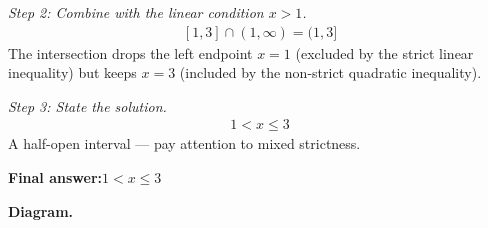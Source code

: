 \documentclass[11pt]{article}
\begin{document}
\textit{Step 2: Combine with the linear condition \( x > 1 \).}
\[\begin{gathered}
[1, 3] \cap (1, \infty) = (1, 3]
\end{gathered}\]
The intersection drops the left endpoint \( x = 1 \) (excluded by the strict linear inequality) but keeps \( x = 3 \) (included by the non-strict quadratic inequality).

\textit{Step 3: State the solution.}
\[\begin{gathered}
1 < x \leq 3
\end{gathered}\]
A half-open interval --- pay attention to mixed strictness.

\begin{answerbox}
\textbf{Final answer:}\quad \(\displaystyle 1 < x \leq 3\)
\end{answerbox}
\textbf{Diagram.}
\end{document}
